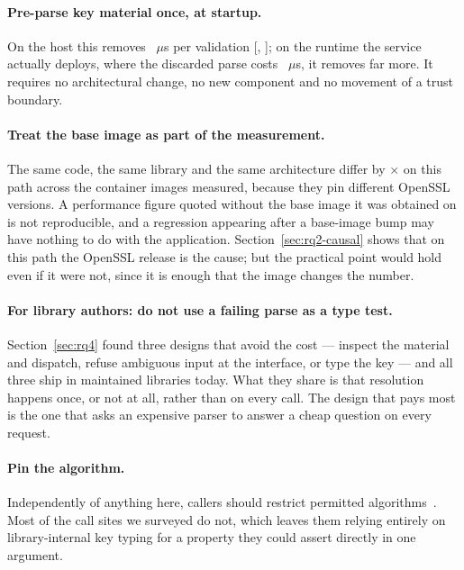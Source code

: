 \documentclass[pdflatex,sn-basic,twocolumn]{sn-jnl}%
\begin{document}
\paragraph{Pre-parse key material once, at startup.} On the host this removes
\HostStringPenalty~$\mu$s per validation
[\HostStringPenaltyCiLo, \HostStringPenaltyCiHi]; on the runtime the service
actually deploys, where the discarded parse costs
\NodeEighteenProbeThrows~$\mu$s, it removes far more. It requires no
architectural change, no new component and no movement of a trust boundary.

\paragraph{Treat the base image as part of the measurement.} The same code, the
same library and the same architecture differ by \SpanProbeThrows$\times$ on this
path across the container images measured, because they pin different OpenSSL
versions. A performance figure quoted without the base image it was obtained on
is not reproducible, and a regression appearing after a base-image bump may have
nothing to do with the application. Section~\ref{sec:rq2-causal} shows that on
this path the OpenSSL release is the cause; but the practical point would hold
even if it were not, since it is enough that the image changes the number.

\paragraph{For library authors: do not use a failing parse as a type test.}
Section~\ref{sec:rq4} found three designs that avoid the cost --- inspect the
material and dispatch, refuse ambiguous input at the interface, or type the
key --- and all three ship in maintained libraries today. What they share is
that resolution happens once, or not at all, rather than on every call. The
design that pays most is the one that asks an expensive parser to answer a cheap
question on every request.

\paragraph{Pin the algorithm.} Independently of anything here, callers should
restrict permitted algorithms~\citep{rfc8725}. Most of the call sites we surveyed
do not, which leaves them relying entirely on library-internal key typing for a
property they could assert directly in one argument.
\end{document}

